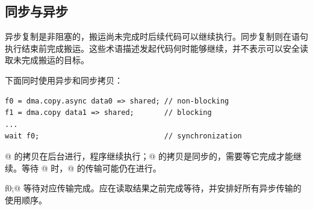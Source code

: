\subsection*{同步与异步}

异步复制是非阻塞的，搬运尚未完成时后续代码可以继续执行。同步复制则在语句执行结束前完成搬运。这些术语描述发起代码何时能够继续，并不表示可以安全读取未完成搬运的目标。

下面同时使用异步和同步拷贝：

\begin{lstlisting}[language=croqtile,caption={同步与异步}]
f0 = dma.copy.async data0 => shared; // non-blocking
f1 = dma.copy data1 => shared;       // blocking
...
wait f0;                             // synchronization
\end{lstlisting}

@ 的拷贝在后台进行，程序继续执行；@ 的拷贝是同步的，需要等它完成才能继续。等待 @ 时，@ 的传输可能仍在进行。

\co@wait f0;@ 等待对应传输完成。应在读取结果之前完成等待，并安排好所有异步传输的使用顺序。
